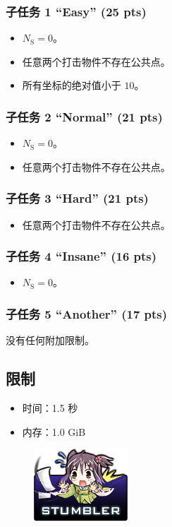 \documentclass[UTF8, 11pt, a4paper]{article}
\begin{document}
\subsubsection*{子任务 1 “Easy” (25 pts)}
\begin{itemize}
    \item $N_\mathrm{S} = 0$。
    \item 任意两个打击物件不存在公共点。
    \item 所有坐标的绝对值小于 $10$。
\end{itemize}
\subsubsection*{子任务 2 “Normal” (21 pts)}
\begin{itemize}
    \item $N_\mathrm{S} = 0$。
    \item 任意两个打击物件不存在公共点。
\end{itemize}
\subsubsection*{子任务 3 “Hard” (21 pts)}
\begin{itemize}
    \item 任意两个打击物件不存在公共点。
\end{itemize}
\subsubsection*{子任务 4 “Insane” (16 pts)}
\begin{itemize}
    \item $N_\mathrm{S} = 0$。
\end{itemize}
\subsubsection*{子任务 5 “Another” (17 pts)}
    没有任何附加限制。

\subsection*{限制}
\begin{itemize}
\item 时间：1.5 秒
\item 内存：1.0 GiB
\end{itemize}

\begin{figure}[h]\centering
\includegraphics[scale=0.55]{stumbler.png}
\end{figure}
\end{document}
